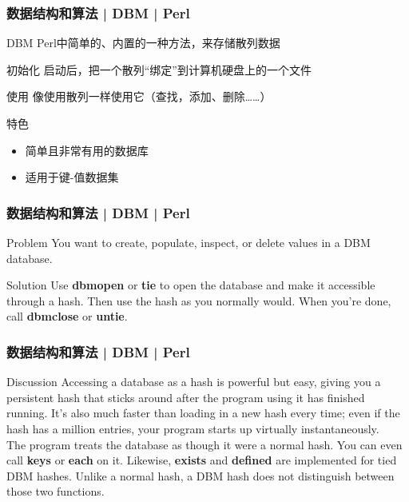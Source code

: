 \begin{frame}
  \frametitle{数据结构和算法 | DBM | Perl}
  \begin{block}{DBM}
    Perl中简单的、内置的一种方法，来存储散列数据
  \end{block}
  \pause
  \begin{block}{初始化}
    启动后，把一个散列“绑定”到计算机硬盘上的一个文件
  \end{block}
  \pause
  \begin{block}{使用}
    像使用散列一样使用它（查找，添加、删除……）
  \end{block}
  \pause
  \begin{block}{特色}
    \begin{itemize}
      \item 简单且非常有用的数据库
      \item 适用于键-值数据集
    \end{itemize}
  \end{block}
\end{frame}

\begin{frame}
  \frametitle{数据结构和算法 | DBM | Perl}
  \begin{block}{Problem}
    You want to create, populate, inspect, or delete values in a DBM database.
  \end{block}
  \pause
  \begin{block}{Solution}
    Use \textbf{dbmopen} or \textbf{tie} to open the database and make it accessible through a hash. Then use the hash as you normally would. When you’re done, call \textbf{dbmclose} or \textbf{untie}.
  \end{block}
\end{frame}

\begin{frame}
  \frametitle{数据结构和算法 | DBM | Perl}
  \begin{block}{Discussion}
    Accessing a database as a hash is powerful but easy, giving you a persistent hash that sticks around after the program using it has finished running. It's also much faster than loading in a new hash every time; even if the hash has a million entries, your program starts up virtually instantaneously.\\
    \vspace{0.5em}
    The program treats the database as though it were a normal hash. You can even call \textbf{keys} or \textbf{each} on it. Likewise, \textbf{exists} and \textbf{defined} are implemented for tied DBM hashes. Unlike a normal hash, a DBM hash does not distinguish between those two functions.
  \end{block}
\end{frame}

